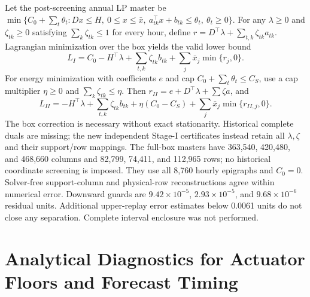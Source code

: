 \documentclass[11pt]{article}
\begin{document}
Let the post-screening annual LP master be $\min\{C_0+\sum_t\theta_t: Dx\leq H,\ 0\leq x\leq\bar x,\ a_{tk}^\top x+b_{tk}\leq\theta_t,\ \theta_t\geq0\}$. For any $\lambda\geq0$ and $\zeta_{tk}\geq0$ satisfying $\sum_k\zeta_{tk}\leq1$ for every hour, define $r=D^\top\lambda+\sum_{t,k}\zeta_{tk}a_{tk}$. Lagrangian minimization over the box yields the valid lower bound
\begin{equation}
 L_I=C_0-H^\top\lambda+\sum_{t,k}\zeta_{tk}b_{tk}+\sum_j\bar x_j\min\{r_j,0\}.
\end{equation}
For energy minimization with coefficients $e$ and cap $C_0+\sum_t\theta_t\leq C_S$, use a cap multiplier $\eta\geq0$ and $\sum_k\zeta_{tk}\leq\eta$. Then $r_{II}=e+D^\top\lambda+\sum\zeta a$, and
\begin{equation}
 L_{II}=-H^\top\lambda+\sum_{t,k}\zeta_{tk}b_{tk}+\eta(C_0-C_S)+\sum_j\bar x_j\min\{r_{II,j},0\}.
\end{equation}
The box correction is necessary without exact stationarity. Historical complete duals are missing; the new independent Stage-I certificates instead retain all $\lambda,\zeta$ and their support/row mappings. The full-box masters have 363,540, 420,480, and 468,660 columns and 82,799, 74,411, and 112,965 rows; no historical coordinate screening is imposed. They use all 8,760 hourly epigraphs and $C_0=0$. Solver-free support-column and physical-row reconstructions agree within numerical error. Downward guards are $9.42\times10^{-5}$, $2.93\times10^{-5}$, and $9.68\times10^{-6}$ residual units. Additional upper-replay error estimates below 0.0061 units do not close any separation. Complete interval enclosure was not performed.

\section{Analytical Diagnostics for Actuator Floors and Forecast Timing}
\end{document}
